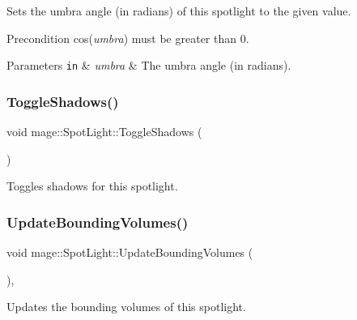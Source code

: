 Sets the umbra angle (in radians) of this spotlight to the given value.

\begin{DoxyPrecond}{Precondition}
cos({\itshape umbra}) must be greater than 0. 
\end{DoxyPrecond}

\begin{DoxyParams}[1]{Parameters}
\mbox{\tt in}  & {\em umbra} & The umbra angle (in radians). \\
\hline
\end{DoxyParams}
\hypertarget{classmage_1_1_spot_light_ae81d5d3c485a85f373d5b7b861919a3c}{}\label{classmage_1_1_spot_light_ae81d5d3c485a85f373d5b7b861919a3c} 
\subsubsection{\texorpdfstring{Toggle\+Shadows()}{ToggleShadows()}}
{\footnotesize\ttfamily void mage\+::\+Spot\+Light\+::\+Toggle\+Shadows (\begin{DoxyParamCaption}{ }\end{DoxyParamCaption})\hspace{0.3cm}{\ttfamily [noexcept]}}

Toggles shadows for this spotlight. \hypertarget{classmage_1_1_spot_light_a83035abee0050acdca47b1f95b30a793}{}\label{classmage_1_1_spot_light_a83035abee0050acdca47b1f95b30a793} 
\subsubsection{\texorpdfstring{Update\+Bounding\+Volumes()}{UpdateBoundingVolumes()}}
{\footnotesize\ttfamily void mage\+::\+Spot\+Light\+::\+Update\+Bounding\+Volumes (\begin{DoxyParamCaption}{ }\end{DoxyParamCaption})\hspace{0.3cm}{\ttfamily [private]}, {\ttfamily [noexcept]}}

Updates the bounding volumes of this spotlight. \hypertarget{classmage_1_1_spot_light_af41a8c0d83b45d048a2d1a030c1235f8}{}\label{classmage_1_1_spot_light_af41a8c0d83b45d048a2d1a030c1235f8} 
